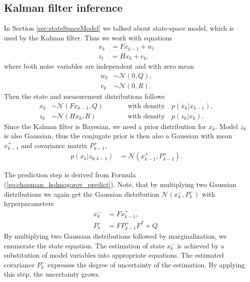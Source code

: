 \subsection{Kalman filter inference}
In Section \ref{sec:stateSpaceModel} we talked about state-space model, which is used by the Kalman filter. Thus we work
with equations
\begin{align}
    x_k &= Fx_{k-1} + w_t \\
    z_t &= Hx_k + v_k,
\end{align}
where both noise variables are independent and with zero mean
\begin{align}
    w_k &\sim \mathcal{N}(0,Q), \\
    v_k &\sim \mathcal{N}(0,R).
\end{align}
Then the state and measurement distributions follows
\begin{align}
    x_k &\sim \mathcal{N}(Fx_{k-1},Q) \qquad && \text{with density}\quad p(x_k|x_{k-1}), \\
    z_k &\sim  \mathcal{N}(Hx_k,R) \qquad && \text{with density}\quad p(z_k|x_k).
\end{align}
Since the Kalman filter is Bayesian, we need a prior distribution for $x_k$. Model $z_k$ is also Gaussian, thus the
conjugate prior is then also a Gaussian with mean $x_{k-1}^+$ and covariance matrix $P_{k-1}^+$,
\begin{align}
    p(x_k|z_{0:k-1}) &= \mathcal{N}(x_{k-1}^+,P_{k-1}^+).
\end{align}

The prediction step is derived from Formula (\ref{eq:chapman_kolmogorov_predict}). Note, that by multiplying two
Gaussian distributions we again get the Gaussian distribution $\mathcal{N}(x_k^-,P_k^-)$ with hyperparameters
\begin{align}
    x_k^- &= Fx_{k-1}^+, \\
    P_k^- &= FP_{k-1}^{+}F^T + Q.
\end{align}
By multiplying two Gaussian distributions followed by marginalization, we enumerate the state equation. The
estimation
of state $x_k^-$ is achieved by a substitution of model variables into appropriate equations. The estimated covariance $
P_k^-$
expresses the degree of uncertainty of the estimation. By applying this step, the uncertainty grows.

